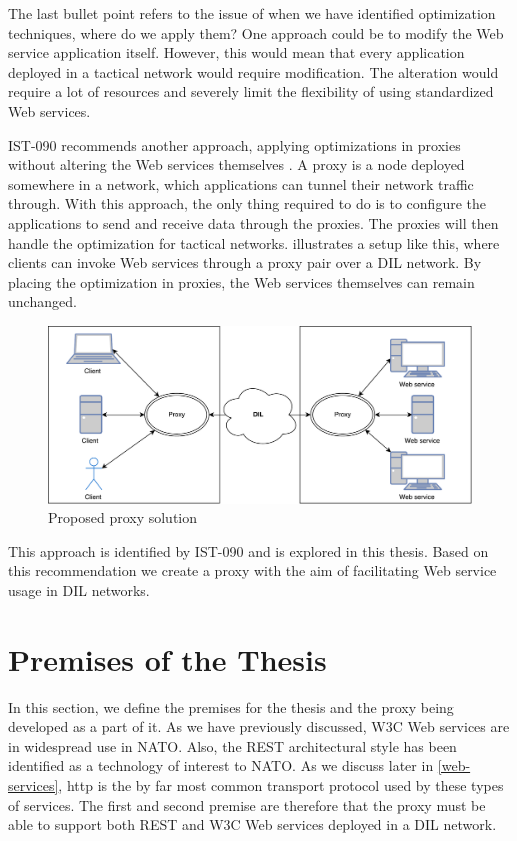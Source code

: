 The last bullet point refers to the issue of when we have identified
optimization techniques, where do we apply them? One approach could be to modify
the Web service application itself. However, this would mean that every
application deployed in a tactical network would require modification. The
alteration would require a lot of resources and severely limit the flexibility
of using standardized Web services.

IST-090 recommends another approach, applying optimizations in proxies without
altering the Web services themselves \cite{ist-090}. A proxy is a node deployed
somewhere in a network, which applications can tunnel their network traffic
through. With this approach, the only thing required to do is to configure the
applications to send and receive data through the proxies. The proxies will then
handle the optimization for tactical networks.
 illustrates a setup like this, where
clients can invoke Web services through a proxy pair over a DIL network. By
placing the optimization in proxies, the Web services themselves can remain
unchanged.

\begin{figure}[h] \includegraphics[scale=0.5]{images/proposed_solution.pdf}
\caption{Proposed proxy solution} \label{figure-proposed-proxy-solution}
\end{figure}

This approach is identified by IST-090 and is explored in this thesis. Based on
this recommendation we create a proxy with the aim of facilitating Web service
usage in DIL networks.


\section{Premises of the Thesis}

In this section, we define the premises for the thesis and the proxy being
developed as a part of it. As we have previously discussed, W3C Web services are
in widespread use in NATO. Also, the REST architectural style has been identified
as a technology of interest to NATO. As we discuss later in \cref{web-services},
\gls{http} is the by far most common transport protocol used by these types of
services. The first and second premise are therefore that the proxy must be able
to support both REST and W3C Web services deployed in a DIL network.

